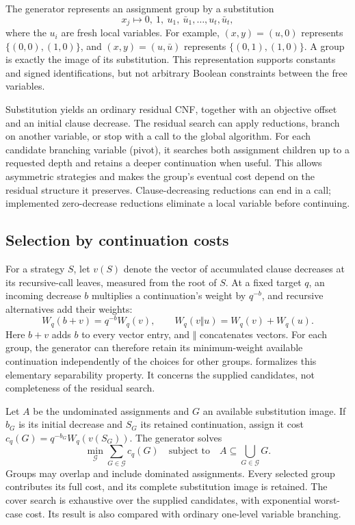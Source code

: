 \documentclass[11pt]{article}
\theoremstyle{definition}
\theoremstyle{remark}
\begin{document}
The generator represents an assignment group by a substitution
\begin{equation}
 x_j\longmapsto 0,\ 1,\ u_1,\ \bar u_1,\ldots,u_t,\bar u_t,
 \label{eq:substitution}
\end{equation}
where the $u_i$ are fresh local variables. For example, $(x,y)=(u,0)$
represents $\{(0,0),(1,0)\}$, and $(x,y)=(u,\bar u)$ represents
$\{(0,1),(1,0)\}$. A group is exactly the image of its substitution.
This representation supports constants and signed identifications, but not
arbitrary Boolean constraints between the free variables.

Substitution yields an ordinary residual CNF, together with an objective offset
and an initial clause decrease. The residual search can apply reductions,
branch on another variable, or stop with a call to the global algorithm.
For each candidate branching variable (pivot), it searches both assignment
children up to a requested depth and retains a deeper continuation when useful.
This allows asymmetric strategies and makes
the group's eventual cost depend on the residual structure it preserves.
Clause-decreasing reductions can end in a call; implemented zero-decrease
reductions eliminate a local variable before continuing.

\subsection{Selection by continuation costs}
\label{sec:fixed-target}

For a strategy $S$, let $v(S)$ denote the vector of accumulated clause
decreases at its recursive-call leaves, measured from the root of $S$.
At a fixed target $q$, an incoming decrease $b$ multiplies a continuation's
weight by $q^{-b}$, and recursive alternatives add their weights:
\begin{equation}
 W_q(b+v)=q^{-b}W_q(v),\qquad
 W_q(v\Vert u)=W_q(v)+W_q(u).
 \label{eq:weight-composition}
\end{equation}
Here $b+v$ adds $b$ to every vector entry, and $\Vert$ concatenates vectors.
For each group, the generator can therefore retain its minimum-weight
available continuation independently of the choices for other groups.
 formalizes this elementary separability property.
It concerns the supplied candidates, not completeness of the residual search.

Let $A$ be the undominated assignments and $G$ an available substitution
image. If $b_G$ is its initial decrease and $S_G$ its retained continuation,
assign it cost $c_q(G)=q^{-b_G}W_q(v(S_G))$. The generator solves
\begin{equation}
 \min_{\mathcal G}\sum_{G\in\mathcal G}c_q(G)
 \quad\text{subject to}\quad A\subseteq\bigcup_{G\in\mathcal G}G.
 \label{eq:group-cover}
\end{equation}
Groups may overlap and include dominated assignments. Every selected group
contributes its full cost, and its complete substitution image is retained.
The cover search is exhaustive over the supplied candidates, with exponential
worst-case cost. Its result is also compared with ordinary one-level variable
branching.
\end{document}
